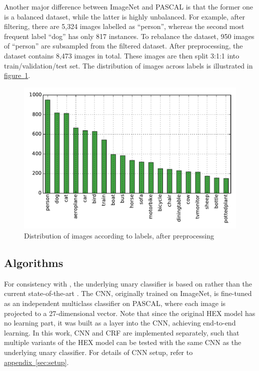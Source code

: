 \documentclass[11pt,a4paper]{article}
\begin{document}
Another major difference between ImageNet and PASCAL is that the former one is a balanced dataset, while the latter is highly unbalanced. For example, after filtering, there are 5,324 images labelled as ``person'', whereas the second most frequent label ``dog'' has only 817 instances. To rebalance the dataset, 950 images of ``person'' are subsampled from the filtered dataset.  After preprocessing, the dataset contains 8,473 images in total. These images are then split 3:1:1 into train/validation/test set. The distribution of images across labels is illustrated in \hyperref[fig:distro]{figure~\ref{fig:distro}}.
\begin{figure}[htbp]
\centering
\includegraphics[scale=0.8]{distro.pdf}
\caption{Distribution of images according to labels, after preprocessing}
\label{fig:distro}
\end{figure}

\subsection{Algorithms}

For consistency with \cite{deng2014large}, the underlying unary classifier is based on \cite{krizhevsky2012imagenet} rather than the current state-of-the-art \cite{simonyan2014very}. The CNN, originally trained on ImageNet, is fine-tuned as an independent multiclass classifier on PASCAL, where each image is projected to a 27-dimensional vector. Note that since the original HEX model has no learning part, it was built as a layer into the CNN, achieving end-to-end learning. In this work, CNN and CRF are implemented separately, such that multiple variants of the HEX model can be tested with the same CNN as the underlying unary classifier. For details of CNN setup, refer to \hyperref[sec:setup]{appendix~\ref{sec:setup}}.
\end{document}
